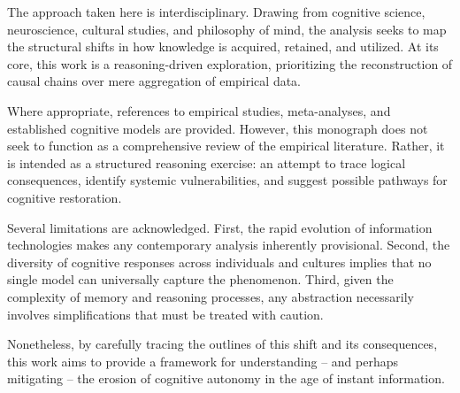 The approach taken here is interdisciplinary. Drawing from cognitive
science, neuroscience, cultural studies, and philosophy of mind, the
analysis seeks to map the structural shifts in how knowledge is
acquired, retained, and utilized. At its core, this work is a
reasoning-driven exploration, prioritizing the reconstruction of causal
chains over mere aggregation of empirical data.

Where appropriate, references to empirical studies, meta-analyses, and
established cognitive models are provided. However, this monograph does
not seek to function as a comprehensive review of the empirical
literature. Rather, it is intended as a structured reasoning exercise:
an attempt to trace logical consequences, identify systemic
vulnerabilities, and suggest possible pathways for cognitive
restoration.

Several limitations are acknowledged. First, the rapid evolution of
information technologies makes any contemporary analysis inherently
provisional. Second, the diversity of cognitive responses across
individuals and cultures implies that no single model can universally
capture the phenomenon. Third, given the complexity of memory and
reasoning processes, any abstraction necessarily involves
simplifications that must be treated with caution.

Nonetheless, by carefully tracing the outlines of this shift and its
consequences, this work aims to provide a framework for understanding --
and perhaps mitigating -- the erosion of cognitive autonomy in the age of
instant information.